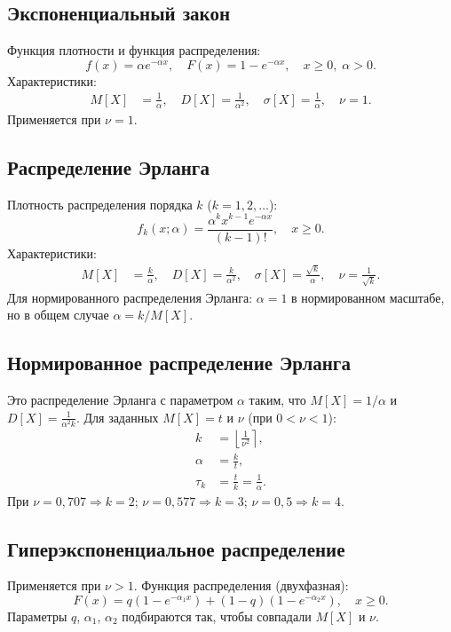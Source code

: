 \documentclass[a4paper,12pt]{article}
\begin{document}
\subsection{Экспоненциальный закон}
Функция плотности и функция распределения:
\begin{equation}
f(x) = \alpha e^{-\alpha x}, \quad F(x) = 1 - e^{-\alpha x}, \quad x \geq 0, \; \alpha > 0.
\end{equation}
Характеристики:
\begin{align}
M[X] &= \frac{1}{\alpha}, \quad D[X] = \frac{1}{\alpha^2}, \quad \sigma[X] = \frac{1}{\alpha}, \quad \nu = 1.
\end{align}
Применяется при $\nu = 1$.

\subsection{Распределение Эрланга}
Плотность распределения порядка $k$ ($k = 1, 2, \dots$):
\begin{equation}
f_k(x; \alpha) = \frac{\alpha^k x^{k-1} e^{-\alpha x}}{(k-1)!}, \quad x \geq 0.
\end{equation}
Характеристики:
\begin{align}
M[X] &= \frac{k}{\alpha}, \quad D[X] = \frac{k}{\alpha^2}, \quad \sigma[X] = \frac{\sqrt{k}}{\alpha}, \quad \nu = \frac{1}{\sqrt{k}}.
\end{align}
Для нормированного распределения Эрланга: $\alpha = 1$ в нормированном масштабе, но в общем случае $\alpha = k/M[X]$.

\subsection{Нормированное распределение Эрланга}
Это распределение Эрланга с параметром $\alpha$ таким, что $M[X] = 1/\alpha$ и $D[X] = \frac{1}{\alpha^2 k}$.
Для заданных $M[X] = t$ и $\nu$ (при $0 < \nu < 1$):
\begin{align}
k &= \left\lfloor \frac{1}{\nu^2} \right\rceil, \label{eq:k_erlang} \\
\alpha &= \frac{k}{t}, \label{eq:alpha_erlang} \\
\tau_k &= \frac{t}{k} = \frac{1}{\alpha}. \label{eq:tau}
\end{align}
При $\nu = 0{,}707 \Rightarrow k=2$; $\nu = 0{,}577 \Rightarrow k=3$; $\nu = 0{,}5 \Rightarrow k=4$.

\subsection{Гиперэкспоненциальное распределение}
Применяется при $\nu > 1$. Функция распределения (двухфазная):
\begin{equation}
F(x) = q\left(1 - e^{-\alpha_1 x}\right) + (1-q)\left(1 - e^{-\alpha_2 x}\right), \quad x \geq 0.
\end{equation}
Параметры $q$, $\alpha_1$, $\alpha_2$ подбираются так, чтобы совпадали $M[X]$ и $\nu$.
\end{document}
